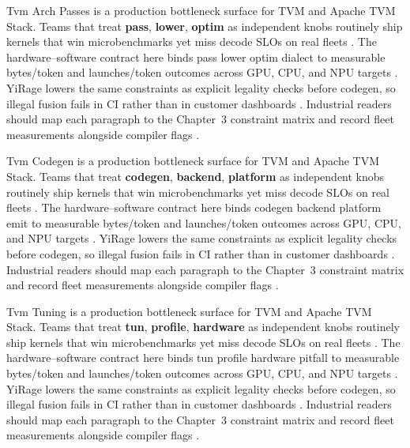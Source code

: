 Tvm Arch Passes is a production bottleneck surface for TVM and Apache TVM Stack. Teams that treat \textbf{pass}, \textbf{lower}, \textbf{optim} as independent knobs routinely ship kernels that win microbenchmarks yet miss decode SLOs on real fleets \citep{taxbreak2026,semianalysis2024tma}. The hardware--software contract here binds pass lower optim dialect to measurable bytes/token and launches/token outcomes across GPU, CPU, and NPU targets \citep{memoryfloor2026,amd2024xdna}. YiRage lowers the same constraints as explicit legality checks before codegen, so illegal fusion fails in CI rather than in customer dashboards \citep{nvidia2022hopper,amd2024aie}. Industrial readers should map each paragraph to the Chapter~3 constraint matrix and record fleet measurements alongside compiler flags \citep{semianalysis2024tma,dlbook}.

Tvm Codegen is a production bottleneck surface for TVM and Apache TVM Stack. Teams that treat \textbf{codegen}, \textbf{backend}, \textbf{platform} as independent knobs routinely ship kernels that win microbenchmarks yet miss decode SLOs on real fleets \citep{memoryfloor2026,amd2024xdna}. The hardware--software contract here binds codegen backend platform emit to measurable bytes/token and launches/token outcomes across GPU, CPU, and NPU targets \citep{nvidia2022hopper,amd2024aie}. YiRage lowers the same constraints as explicit legality checks before codegen, so illegal fusion fails in CI rather than in customer dashboards \citep{semianalysis2024tma,dlbook}. Industrial readers should map each paragraph to the Chapter~3 constraint matrix and record fleet measurements alongside compiler flags \citep{amd2024xdna,dao2022flashattention}.

Tvm Tuning is a production bottleneck surface for TVM and Apache TVM Stack. Teams that treat \textbf{tun}, \textbf{profile}, \textbf{hardware} as independent knobs routinely ship kernels that win microbenchmarks yet miss decode SLOs on real fleets \citep{nvidia2022hopper,amd2024aie}. The hardware--software contract here binds tun profile hardware pitfall to measurable bytes/token and launches/token outcomes across GPU, CPU, and NPU targets \citep{semianalysis2024tma,dlbook}. YiRage lowers the same constraints as explicit legality checks before codegen, so illegal fusion fails in CI rather than in customer dashboards \citep{amd2024xdna,dao2022flashattention}. Industrial readers should map each paragraph to the Chapter~3 constraint matrix and record fleet measurements alongside compiler flags \citep{amd2024aie,kwon2023vllm}.

